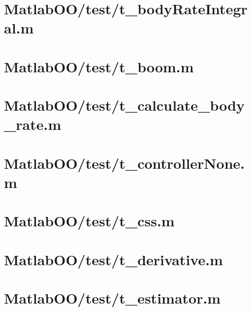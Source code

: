 \pagebreak
\section{MatlabOO/test/t\_bodyRateIntegral.m}\label{code:MatlabOO/test/t_bodyRateIntegral.m}


\pagebreak
\section{MatlabOO/test/t\_boom.m}\label{code:MatlabOO/test/t_boom.m}


\pagebreak
\section{MatlabOO/test/t\_calculate\_body\_rate.m}\label{code:MatlabOO/test/t_calculate_body_rate.m}


\pagebreak
\section{MatlabOO/test/t\_controllerNone.m}\label{code:MatlabOO/test/t_controllerNone.m}


\pagebreak
\section{MatlabOO/test/t\_css.m}\label{code:MatlabOO/test/t_css.m}


\pagebreak
\section{MatlabOO/test/t\_derivative.m}\label{code:MatlabOO/test/t_derivative.m}


\pagebreak
\section{MatlabOO/test/t\_estimator.m}\label{code:MatlabOO/test/t_estimator.m}


